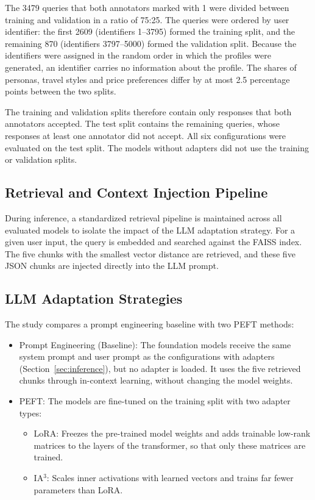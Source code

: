 \documentclass[journal,article,submit,pdftex,moreauthors]{Definitions/mdpi}
\begin{document}
The 3479 queries that both annotators marked with 1 were divided between training and validation in a ratio of 75:25. The queries were ordered by user identifier: the first 2609 (identifiers 1--3795) formed the training split, and the remaining 870 (identifiers 3797--5000) formed the validation split. Because the identifiers were assigned in the random order in which the profiles were generated, an identifier carries no information about the profile. The shares of personas, travel styles and price preferences differ by at most 2.5 percentage points between the two splits.

The training and validation splits therefore contain only responses that both annotators accepted. The test split contains the remaining queries, whose responses at least one annotator did not accept. All six configurations were evaluated on the test split. The models without adapters did not use the training or validation splits.

\subsection{Retrieval and Context Injection Pipeline}
During inference, a standardized retrieval pipeline is maintained across all evaluated models to isolate the impact of the LLM adaptation strategy. For a given user input, the query is embedded and searched against the FAISS index. The five chunks with the smallest vector distance are retrieved, and these five JSON chunks are injected directly into the LLM prompt.

\subsection{LLM Adaptation Strategies}
The study compares a prompt engineering baseline with two PEFT methods:

\begin{itemize}[labelsep=2.5mm,topsep=-3pt]
\item Prompt Engineering (Baseline): The foundation models receive the same system prompt and user prompt as the configurations with adapters (Section~\ref{sec:inference}), but no adapter is loaded. It uses the five retrieved chunks through in-context learning, without changing the model weights.
\item PEFT: The models are fine-tuned on the training split with two adapter types:
\begin{itemize}[labelsep=2.5mm,topsep=-3pt]
\item LoRA: Freezes the pre-trained model weights and adds trainable low-rank matrices to the layers of the transformer, so that only these matrices are trained.
\item IA$^3$: Scales inner activations with learned vectors and trains far fewer parameters than LoRA.
\end{itemize}\vspace{3pt}
\end{itemize}\vspace{3pt}
\end{document}
